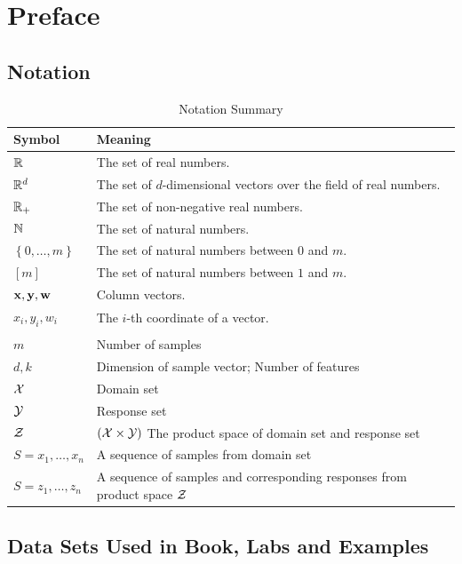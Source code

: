 \section{Preface}

\subsection{Notation}

\begin{table}[h!]
	\begin{center}
		\caption{Notation Summary}
		\label{tab:notation}
		\begin{tabular}{l|l}
			\textbf{Symbol} & \textbf{Meaning} \\
			\hline
			$\mathbb{R}$ & The set of real numbers. \\
			$\mathbb{R}^d$ & The set of $d$-dimensional vectors over the field of real numbers. \\
			$\mathbb{R}_+$ & The set of non-negative real numbers. \\
			$\mathbb{N}$ & The set of natural numbers. \\
			$\left\{0,\ldots,m\right\}$ & The set of natural numbers between $0$ and $m$. \\
			$\left[m\right]$ & The set of natural numbers between $1$ and $m$. \\
			$\mathbf{x},\mathbf{y},\mathbf{w}$ & Column vectors. \\
			$x_i,y_i,w_i$ & The $i$-th coordinate of a vector. \\
			\\
			\hline
			$m$ & Number of samples \\
			$d, k$ & Dimension of sample vector; Number of features \\
			$\mathcal{X}$ & Domain set \\
			$\mathcal{Y}$ & Response set \\
			$\mathcal{Z}$ & $\left(\mathcal{X}\times\mathcal{Y}\right)$ The product space of domain set and response set\\
			$S=x_1,\ldots,x_n$ & A sequence of samples from domain set \\
			$S=z_1,\ldots,z_n$ & A sequence of samples and corresponding responses from product space $\mathcal{Z}$ \\
		\end{tabular}
	\end{center}
\end{table}


\subsection{Data Sets Used in Book, Labs and Examples}